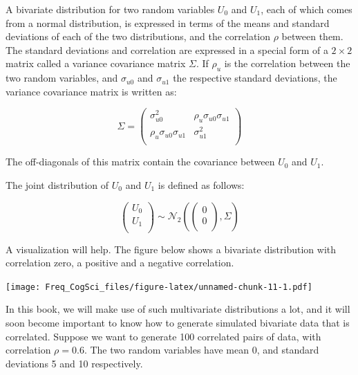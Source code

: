 \documentclass[12pt,]{krantz}
\begin{document}
A bivariate distribution for two random variables \(U_0\) and \(U_1\), each of which comes from a normal distribution, is expressed in terms of the means and standard deviations of each of the two distributions, and the correlation \(\rho\) between them. The standard deviations and correlation are expressed in a special form of a \(2\times 2\) matrix called a variance covariance matrix \(\Sigma\). If \(\rho_u\) is the correlation between the two random variables, and \(\sigma _{u0}\) and \(\sigma _{u1}\) the respective standard deviations, the variance covariance matrix is written as:

\begin{equation}\label{eq:covmatfoundations}
\Sigma
=
\begin{pmatrix}
\sigma _{u0}^2  & \rho _{u}\sigma _{u0}\sigma _{u1}\\
\rho _{u}\sigma _{u0}\sigma _{u1}    & \sigma _{u1}^2\\
\end{pmatrix}
\end{equation}

The off-diagonals of this matrix contain the covariance between \(U_0\) and \(U_1\).

The joint distribution of \(U_0\) and \(U_1\) is defined as follows:

\begin{equation}\label{eq:jointpriordistfoundations}
\begin{pmatrix}
  U_0 \\ 
  U_1 \\
\end{pmatrix}
\sim 
\mathcal{N}_2 \left(
\begin{pmatrix}
  0 \\
  0 \\
\end{pmatrix},
\Sigma
\right)
\end{equation}

A visualization will help. The figure below shows a bivariate distribution with correlation zero, a positive and a negative correlation.

\texttt{[image: Freq\_CogSci\_files/figure-latex/unnamed-chunk-11-1.pdf]}

In this book, we will make use of such multivariate distributions a lot, and it will soon become important to know how to generate simulated bivariate data that is correlated. Suppose we want to generate 100 correlated pairs of data, with correlation \(\rho=0.6\). The two random variables have mean 0, and standard deviations 5 and 10 respectively.
\end{document}
